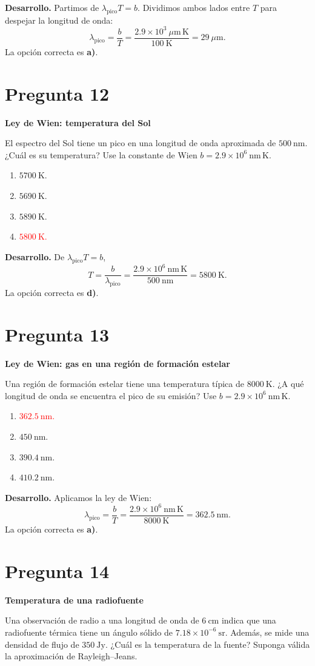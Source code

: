 \documentclass[a4paper,11pt]{article}
\newcommand{\pregunta}[2]{\section*{Pregunta #1}\textbf{#2}\par}
\begin{document}
\textbf{Desarrollo.} Partimos de $\lambda_{\mathrm{pico}}T=b$. Dividimos ambos lados entre $T$ para despejar la longitud de onda:
\[
\lambda_{\mathrm{pico}}=\frac{b}{T}
=\frac{2.9\times10^3\ \mu\mathrm{m\,K}}{100\ \mathrm{K}}
=29\ \mu\mathrm{m}.
\]
La opción correcta es \textbf{a)}. \parencite[Sec. 9.4, p. 286]{chaparro2026}

\pregunta{12}{Ley de Wien: temperatura del Sol}

El espectro del Sol tiene un pico en una longitud de onda aproximada de $500\ \mathrm{nm}$. ¿Cuál es su temperatura? Use la constante de Wien $b=2.9\times10^6\ \mathrm{nm\,K}$.

\begin{enumerate}
    \item $5700\ \mathrm{K}$.
    \item $5690\ \mathrm{K}$.
    \item $5890\ \mathrm{K}$.
    \item \textcolor{red}{$5800\ \mathrm{K}$.}
\end{enumerate}

\textbf{Desarrollo.} De $\lambda_{\mathrm{pico}}T=b$,
\[
T=\frac{b}{\lambda_{\mathrm{pico}}}
=\frac{2.9\times10^6\ \mathrm{nm\,K}}{500\ \mathrm{nm}}
=5800\ \mathrm{K}.
\]
La opción correcta es \textbf{d)}. \parencite[Sec. 9.4, pp. 286--287]{chaparro2026}

\pregunta{13}{Ley de Wien: gas en una región de formación estelar}

Una región de formación estelar tiene una temperatura típica de $8000\ \mathrm{K}$. ¿A qué longitud de onda se encuentra el pico de su emisión? Use $b=2.9\times10^6\ \mathrm{nm\,K}$.

\begin{enumerate}
    \item \textcolor{red}{$362.5\ \mathrm{nm}$.}
    \item $450\ \mathrm{nm}$.
    \item $390.4\ \mathrm{nm}$.
    \item $410.2\ \mathrm{nm}$.
\end{enumerate}

\textbf{Desarrollo.} Aplicamos la ley de Wien:
\[
\lambda_{\mathrm{pico}}=\frac{b}{T}
=\frac{2.9\times10^6\ \mathrm{nm\,K}}{8000\ \mathrm{K}}
=362.5\ \mathrm{nm}.
\]
La opción correcta es \textbf{a)}. \parencite[Sec. 9.4, pp. 286--287]{chaparro2026}

\pregunta{14}{Temperatura de una radiofuente}

Una observación de radio a una longitud de onda de $6\ \mathrm{cm}$ indica que una radiofuente térmica tiene un ángulo sólido de $7.18\times10^{-6}\ \mathrm{sr}$. Además, se mide una densidad de flujo de $350\ \mathrm{Jy}$. ¿Cuál es la temperatura de la fuente? Suponga válida la aproximación de Rayleigh--Jeans.
\end{document}
